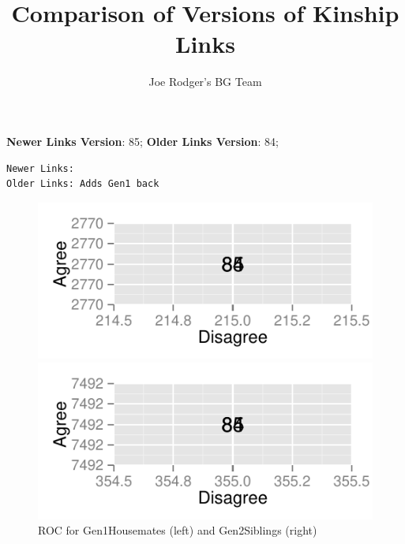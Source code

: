 \documentclass[a4paper]{article}\usepackage[]{graphicx}\usepackage[]{color}
\title{Comparison of Versions of Kinship Links}
\author{Joe Rodger's BG Team}
\makeatletter
\def\maxwidth{ %
  \ifdim\Gin@nat@width>\linewidth
    \linewidth
  \else
    \Gin@nat@width
  \fi
}
\newenvironment{kframe}{%
 \def\at@end@of@kframe{}%
 \ifinner\ifhmode%
  \def\at@end@of@kframe{\end{minipage}}%
  \begin{minipage}{\columnwidth}%
 \fi\fi%
 \def\FrameCommand##1{\hskip\@totalleftmargin \hskip-\fboxsep
 \colorbox{shadecolor}{##1}\hskip-\fboxsep
     \hskip-\linewidth \hskip-\@totalleftmargin \hskip\columnwidth}%
 \MakeFramed {\advance\hsize-\width
   \@totalleftmargin\z@ \linewidth\hsize
   \@setminipage}}%
 {\par\unskip\endMakeFramed%
 \at@end@of@kframe}
\newenvironment{knitrout}{}{} %
\makeatother
\begin{document}
\maketitle

\setlength{\parindent}{0pt}%







\textbf{Newer Links Version}: 85;
\textbf{Older Links Version}: 84;

\begin{knitrout}
\color{fgcolor}\begin{kframe}
\begin{verbatim}
Newer Links:
Older Links: Adds Gen1 back
\end{verbatim}
\end{kframe}
\end{knitrout}


\begin{figure}[htbp]
\begin{knitrout}
\color{fgcolor}
\includegraphics[width=\maxwidth]{figure/unnamed-chunk-31} 

\includegraphics[width=\maxwidth]{figure/unnamed-chunk-32} 

\end{knitrout}

\caption{ROC for Gen1Housemates (left) and Gen2Siblings (right)}
\end{figure}
\end{document}
